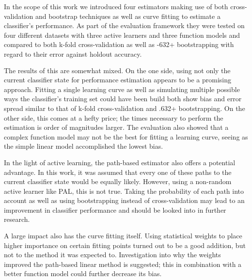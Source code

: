 \label{conclusion}

In the scope of this work we introduced four estimators making use of both cross-validation and bootstrap techniques as well as curve fitting to estimate a classifier's performance. As part of the evaluation framework they were tested on four different datasets with three active learners and three function models and compared to both k-fold cross-validation as well as -632+ bootstrapping with regard to their error against holdout accuracy.

The results of this are somewhat mixed. On the one side, using not only the current classifier state for performance estimation appears to be a promising approach. Fitting a single learning curve as well as simulating multiple possible ways the classifier's training set could have been build both show bias and error spread similar to that of k-fold cross-validation and .632+ bootstrapping. On the other side, this comes at a hefty price; the times necessary to perform the estimation is order of magnitudes larger. The evaluation also showed that a complex function model may not be the best for fitting a learning curve, seeing as the simple linear model accomplished the lowest bias.

In the light of active learning, the path-based estimator also offers a potential advantage. In this work, it was assumed that every one of these paths to the current classifier state would be equally likely. However, using a non-random active learner like PAL, this is not true. Taking the probability of each path into account as well as using bootstrapping instead of cross-validation may lead to an improvement in classifier performance and should be looked into in further research.

A large impact also has the curve fitting itself. Using statistical weights to place higher importance on certain fitting points turned out to be a good addition, but not to the method it was expected to. Investigation into why the weights improved the path-based linear method is suggested; this in combination with a better function model could further decrease its bias.